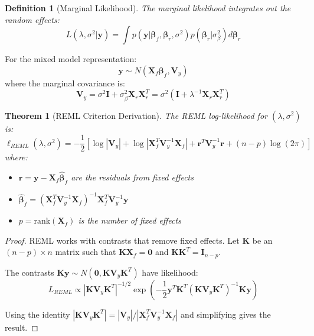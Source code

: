 \documentclass[12pt]{article}
\newtheorem{theorem}{Theorem}
\newtheorem{definition}{Definition}
\begin{document}
\begin{definition}[Marginal Likelihood]
The marginal likelihood integrates out the random effects:
\begin{equation}
L(\lambda, \sigma^2|\mathbf{y}) = \int p(\mathbf{y}|\bm{\beta}_f, \bm{\beta}_r, \sigma^2) p(\bm{\beta}_r|\sigma^2_{\beta}) d\bm{\beta}_r
\end{equation}
\end{definition}

For the mixed model representation:
\begin{equation}
\mathbf{y} \sim N(\mathbf{X}_f\bm{\beta}_f, \mathbf{V}_y)
\end{equation}
where the marginal covariance is:
\begin{equation}
\mathbf{V}_y = \sigma^2\mathbf{I} + \sigma^2_{\beta}\mathbf{X}_r\mathbf{X}_r^T = \sigma^2(\mathbf{I} + \lambda^{-1}\mathbf{X}_r\mathbf{X}_r^T)
\end{equation}

\begin{theorem}[REML Criterion Derivation]
The REML log-likelihood for $(\lambda, \sigma^2)$ is:
\begin{equation}
\ell_{REML}(\lambda, \sigma^2) = -\frac{1}{2}\left[\log|\mathbf{V}_y| + \log|\mathbf{X}_f^T\mathbf{V}_y^{-1}\mathbf{X}_f| + \mathbf{r}^T\mathbf{V}_y^{-1}\mathbf{r} + (n-p)\log(2\pi)\right]
\end{equation}
where:
\begin{itemize}
    \item $\mathbf{r} = \mathbf{y} - \mathbf{X}_f\hat{\bm{\beta}}_f$ are the residuals from fixed effects
    \item $\hat{\bm{\beta}}_f = (\mathbf{X}_f^T\mathbf{V}_y^{-1}\mathbf{X}_f)^{-1}\mathbf{X}_f^T\mathbf{V}_y^{-1}\mathbf{y}$
    \item $p = \text{rank}(\mathbf{X}_f)$ is the number of fixed effects
\end{itemize}
\end{theorem}

\begin{proof}
REML works with contrasts that remove fixed effects. Let $\mathbf{K}$ be an $(n-p) \times n$ matrix such that $\mathbf{K}\mathbf{X}_f = \mathbf{0}$ and $\mathbf{K}\mathbf{K}^T = \mathbf{I}_{n-p}$.

The contrasts $\mathbf{K}\mathbf{y} \sim N(\mathbf{0}, \mathbf{K}\mathbf{V}_y\mathbf{K}^T)$ have likelihood:
\begin{equation}
L_{REML} \propto |\mathbf{K}\mathbf{V}_y\mathbf{K}^T|^{-1/2} \exp\left(-\frac{1}{2}\mathbf{y}^T\mathbf{K}^T(\mathbf{K}\mathbf{V}_y\mathbf{K}^T)^{-1}\mathbf{K}\mathbf{y}\right)
\end{equation}

Using the identity $|\mathbf{K}\mathbf{V}_y\mathbf{K}^T| = |\mathbf{V}_y|/|\mathbf{X}_f^T\mathbf{V}_y^{-1}\mathbf{X}_f|$ and simplifying gives the result.
\end{proof}
\end{document}
